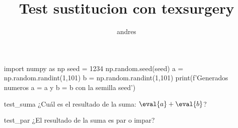 \documentclass[a4paper]{article}
\title{Test sustitucion con texsurgery}
\author{andres}
\begin{document}
\begin{run}
    import numpy as np
    seed = 1234
    np.random.seed(seed)
    a = np.random.randint(1,101)
    b = np.random.randint(1,101)
    print(f'Generados numeros a = {a} y b = {b} con la semilla {seed}')
\end{run} \newline \newline

\begin{question}{test_suma}
    ¿Cuál es el resultado de la suma: $\eval{a} + \eval{b}$?
    \begin{choices}
    \end{choices}
\end{question}


\begin{question}{test_par}
    ¿El resultado de la suma es par o impar?
    \begin{choices}
    \end{choices}
\end{question}
\end{document}
